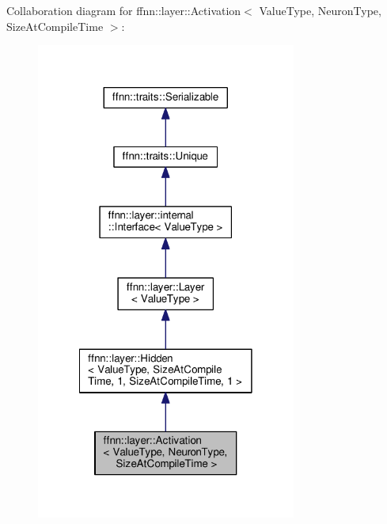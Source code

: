 Collaboration diagram for ffnn\-:\-:layer\-:\-:Activation$<$ Value\-Type, Neuron\-Type, Size\-At\-Compile\-Time $>$\-:
\nopagebreak
\begin{figure}[H]
\begin{center}
\leavevmode
\includegraphics[width=242pt]{classffnn_1_1layer_1_1_activation__coll__graph}
\end{center}
\end{figure}
